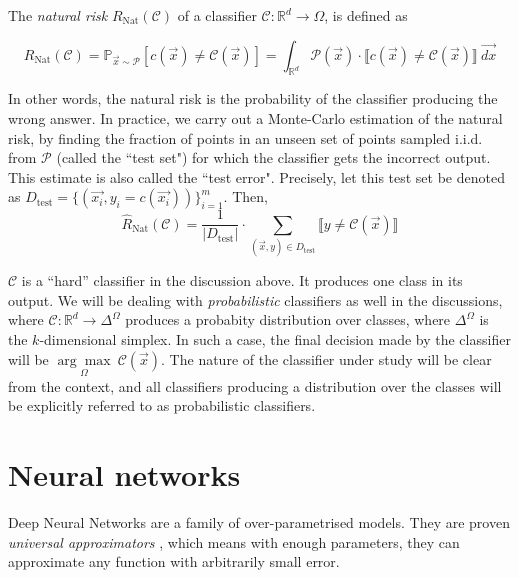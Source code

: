 \documentclass{ociamthesis}
\begin{document}
The \emph{natural risk} $R_{\text{Nat}}(\mathcal{C}) $ of a classifier
$\mathcal{C}: \mathbb{R}^d \to \Omega$, is defined as

\begin{equation}
    R_{\text{Nat}}(\mathcal{C}) = \mathbb{P}_{\vec{x} \sim \mathcal{P}}
    [c(\vec{x}) \neq \mathcal{C}(\vec{x})] = \int_{\mathbb{R}^d} \mathcal{P}(\vec{x})
    \cdot\llbracket c(\vec{x}) \neq \mathcal{C}(\vec{x}) \rrbracket~\vec{dx}
\end{equation}

In other words, the natural risk is the probability of the classifier producing
the wrong answer. In practice, we carry out a Monte-Carlo estimation of the
natural risk, by finding the fraction of points in an unseen set of points
sampled i.i.d. from $\mathcal{P}$ (called the ``test set") for which the
classifier gets the incorrect output. This estimate is also called the ``test
error". Precisely, let this test set be denoted as $D_\text{test} =
\{(\vec{x_i}, y_i=c(\vec{x_i})) \}_{i=1}^m$. Then,
\begin{equation*}
    \hat{R}_{\text{Nat}}(\mathcal{C})
    = \frac{1}{|D_\text{test}|} \cdot \sum_{(\vec{x}, y) \in D_\text{test}} 
    \llbracket y \neq \mathcal{C}(\vec{x}) \rrbracket
\end{equation*}

$\mathcal{C}$ is a ``hard'' classifier in the discussion above. It produces one
class in its output. We will be dealing with \emph{probabilistic} classifiers as
well in the discussions, where $\mathcal{C}:\mathbb{R}^d\to\Delta^\Omega$
produces a probabity distribution over classes, where $\Delta^\Omega$ is the
$k$-dimensional simplex. In such a case, the final decision made by the
classifier will be $\underset{\Omega}{\arg\max}~\mathcal{C}(\vec{x})$. The
nature of the classifier under study will be clear from the context, and all
classifiers producing a distribution over the classes will be explicitly
referred to as probabilistic classifiers.

\section{Neural networks}

Deep Neural Networks are a family of over-parametrised models. They are proven
\emph{universal approximators} \citep{hornik1989multilayer}, which means with
enough parameters, they can approximate any function with arbitrarily small
error.
\end{document}
